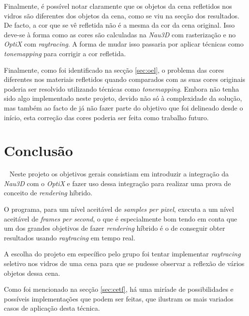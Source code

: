 \documentclass[10pt]{article}
\begin{document}
Finalmente, é possível notar claramente que os objetos da cena refletidos nos vidros são diferentes dos objetos da cena, como se viu na secção dos resultados. De facto, a cor que se vê refletida não é a mesma da cor da cena original. Isso deve-se à forma como as cores são calculadas na \textit{Nau3D} com rasterização e no \textit{OptiX} com \textit{raytracing}. A forma de mudar isso passaria por aplicar técnicas como \textit{tonemapping} para corrigir a cor refletida.

Finalmente, como foi identificado na secção \ref{sec:oel}, o problema das cores diferentes nos materiais refletidos quando comparados com as suas cores originais poderia ser resolvido utilizando técnicas como \textit{tonemapping}. Embora não tenha sido algo implementado neste projeto, devido não só à complexidade da solução, mas também ao facto de já não fazer parte do objetivo que foi delineado desde o início, esta correção das cores poderia ser feita como trabalho futuro.

\newpage


\section{Conclusão}~ \label{sec:con}
Neste projeto os objetivos gerais consistiam em introduzir a integração da \textit{Nau3D} com o \textit{OptiX} e fazer uso dessa integração para realizar uma prova de conceito de \textit{rendering} híbrido.

O programa, para um nível aceitável de \textit{samples per pixel}, executa a um nível aceitável de \textit{frames per second}, o que é especialmente bom tendo em conta que um dos grandes objetivos de fazer \textit{rendering} híbrido é o de conseguir obter resultados usando \textit{raytracing} em tempo real.

A escolha do projeto em específico pelo grupo foi tentar implementar \textit{raytracing} seletivo nos vidros de uma cena para que se pudesse observar a reflexão de vários objetos dessa cena.

Como foi mencionado na secção \ref{sec:cetf}, há uma miríade de possibilidades e possíveis implementações que podem ser feitas, que ilustram os mais variados casos de aplicação desta técnica.



\end{document}
